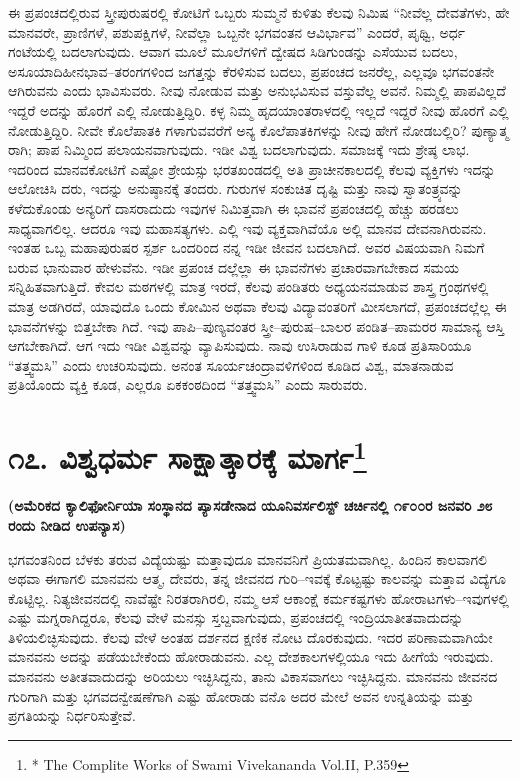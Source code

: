 ಈ ಪ್ರಪಂಚದಲ್ಲಿರುವ ಸ್ತ್ರೀಪುರುಷರಲ್ಲಿ ಕೋಟಿಗೆ ಒಬ್ಬರು ಸುಮ್ಮನೆ ಕುಳಿತು ಕೆಲವು ನಿಮಿಷ “ನೀವೆಲ್ಲ ದೇವತೆಗಳು, ಹೇ ಮಾನವರೇ, ಪ್ರಾಣಿಗಳೆ, ಪಶುಪಕ್ಷಿಗಳೆ, ನೀವೆಲ್ಲಾ ಒಬ್ಬನೇ ಭಗವಂತನ ಆವಿರ್ಭಾವ” ಎಂದರೆ, ಪೃಥ್ವಿ, ಅರ್ಧ ಗಂಟೆಯಲ್ಲಿ ಬದಲಾಗುವುದು. ಆವಾಗ ಮೂಲೆ ಮೂಲೆಗಳಿಗೆ ದ್ವೇಷದ ಸಿಡಿಗುಂಡನ್ನು ಎಸೆಯುವ ಬದಲು, ಅಸೂಯಾದಿಹೀನಭಾವ–ತರಂಗಗಳಿಂದ ಜಗತ್ತನ್ನು ಕೆರಳಿಸುವ ಬದಲು, ಪ್ರಪಂಚದ ಜನರೆಲ್ಲ, ಎಲ್ಲವೂ ಭಗವಂತನೇ ಆಗಿರುವನು ಎಂದು ಭಾವಿಸುವರು. ನೀವು ನೋಡುವ ಮತ್ತು ಅನುಭವಿಸುವ ವಸ್ತುವೆಲ್ಲ ಅವನೆ. ನಿಮ್ಮಲ್ಲಿ ಪಾಪವಿಲ್ಲದೆ ಇದ್ದರೆ ಅದನ್ನು ಹೊರಗೆ ಎಲ್ಲಿ ನೋಡುತ್ತಿದ್ದಿರಿ. ಕಳ್ಳ ನಿಮ್ಮ ಹೃದಯಾಂತರಾಳದಲ್ಲಿ ಇಲ್ಲದೆ ಇದ್ದರೆ ನೀವು ಹೊರಗೆ ಎಲ್ಲಿ ನೋಡುತ್ತಿದ್ದಿರಿ. ನೀವೇ ಕೊಲೆಪಾತಕಿ ಗಳಾಗುವವರೆಗೆ ಅನ್ಯ ಕೊಲೆಪಾತಕಿಗಳನ್ನು ನೀವು ಹೇಗೆ ನೋಡಬಲ್ಲಿರಿ? ಪುಣ್ಯಾತ್ಮ ರಾಗಿ; ಪಾಪ ನಿಮ್ಮಿಂದ ಪಲಾಯನವಾಗುವುದು. ಇಡೀ ವಿಶ್ವ ಬದಲಾಗುವುದು. ಸಮಾಜಕ್ಕೆ ಇದು ಶ್ರೇಷ್ಠ ಲಾಭ. ಇದರಿಂದ ಮಾನವಕೋಟಿಗೆ ಎಷ್ಟೋ ಶ್ರೇಯಸ್ಸು ಭರತಖಂಡದಲ್ಲಿ ಅತಿ ಪ್ರಾಚೀನಕಾಲದಲ್ಲಿ ಕೆಲವು ವ್ಯಕ್ತಿಗಳು ಇದನ್ನು ಆಲೋಚಿಸಿ ದರು, ಇದನ್ನು ಅನುಷ್ಠಾನಕ್ಕೆ ತಂದರು. ಗುರುಗಳ ಸಂಕುಚಿತ ದೃಷ್ಟಿ ಮತ್ತು ನಾವು ಸ್ವಾತಂತ್ರ್ಯವನ್ನು ಕಳೆದುಕೊಂಡು ಅನ್ಯರಿಗೆ ದಾಸರಾದುದು ಇವುಗಳ ನಿಮಿತ್ತವಾಗಿ ಈ ಭಾವನೆ ಪ್ರಪಂಚದಲ್ಲಿ ಹೆಚ್ಚು ಹರಡಲು ಸಾಧ್ಯವಾಗಲಿಲ್ಲ. ಆದರೂ ಇವು ಮಹಾಸತ್ಯಗಳು. ಎಲ್ಲಿ ಇವು ವ್ಯಕ್ತವಾಗಿವೆಯೊ ಅಲ್ಲಿ ಮಾನವ ದೇವನಾಗಿರುವನು. ಇಂತಹ ಒಬ್ಬ ಮಹಾಪುರುಷರ ಸ್ಪರ್ಶ ಒಂದರಿಂದ ನನ್ನ ಇಡೀ ಜೀವನ ಬದಲಾಗಿದೆ. ಅವರ ವಿಷಯವಾಗಿ ನಿಮಗೆ ಬರುವ ಭಾನುವಾರ ಹೇಳುವೆನು. ಇಡೀ ಪ್ರಪಂಚ ದಲ್ಲೆಲ್ಲಾ ಈ ಭಾವನೆಗಳು ಪ್ರಚಾರವಾಗಬೇಕಾದ ಸಮಯ ಸನ್ನಿಹಿತವಾಗುತ್ತಿದೆ. ಕೇವಲ ಮಠಗಳಲ್ಲಿ ಮಾತ್ರ ಇರದೆ, ಕೆಲವು ಪಂಡಿತರು ಅಧ್ಯಯನಮಾಡುವ ಶಾಸ್ತ್ರ ಗ್ರಂಥಗಳಲ್ಲಿ ಮಾತ್ರ ಅಡಗಿರದೆ, ಯಾವುದೊ ಒಂದು ಕೋಮಿನ ಅಥವಾ ಕೆಲವು ವಿದ್ಯಾವಂತರಿಗೆ ಮೀಸಲಾಗದೆ, ಪ್ರಪಂಚದಲ್ಲೆಲ್ಲ ಈ ಭಾವನೆಗಳನ್ನು ಬಿತ್ತಬೇಕಾ ಗಿದೆ. ಇವು ಪಾಪಿ–ಪುಣ್ಯವಂತರ ಸ್ತ್ರೀ–ಪುರುಷ–ಬಾಲರ ಪಂಡಿತ–ಪಾಮರರ ಸಾಮಾನ್ಯ ಆಸ್ತಿ ಆಗಬೇಕಾಗಿದೆ. ಆಗ ಇದು ಇಡೀ ವಿಶ್ವವನ್ನು ವ್ಯಾಪಿಸುವುದು. ನಾವು ಉಸಿರಾಡುವ ಗಾಳಿ ಕೂಡ ಪ್ರತಿಸಾರಿಯೂ “ತತ್ತ್ವಮಸಿ” ಎಂದು ಉಚರಿಸುವುದು. ಅನಂತ ಸೂರ್ಯಚಂದ್ರಾವಳಿಗಳಿಂದ ಕೂಡಿದ ವಿಶ್ವ, ಮಾತನಾಡುವ ಪ್ರತಿಯೊಂದು ವ್ಯಕ್ತಿ ಕೂಡ, ಎಲ್ಲರೂ ಏಕಕಂಠದಿಂದ “ತತ್ತ್ವಮಸಿ” ಎಂದು ಸಾರುವರು.

\chapter[ವಿಶ್ವಧರ್ಮ ಸಾಕ್ಷಾತ್ಕಾರಕ್ಕೆ ಮಾರ್ಗ]{\num{೧೭.} ವಿಶ್ವಧರ್ಮ ಸಾಕ್ಷಾತ್ಕಾರಕ್ಕೆ ಮಾರ್ಗ\protect\footnote{* The Complite Works of Swami Vivekananda Vol.II, P.359}}

\centerline{\textbf{(ಅಮೆರಿಕದ ಕ್ಯಾಲಿಫೋರ್ನಿಯಾ ಸಂಸ್ಥಾನದ ಪ್ಯಾಸಡೇನಾದ ಯೂನಿವರ್ಸಲಿಸ್ಟ್​ ಚರ್ಚಿನಲ್ಲಿ ೧೯೦೦ರ ಜನವರಿ ೨೮ ರಂದು ನೀಡಿದ ಉಪನ್ಯಾಸ)}}

ಭಗವಂತನಿಂದ ಬೆಳಕು ತರುವ ವಿದ್ಯೆಯಷ್ಟು ಮತ್ತಾವುದೂ ಮಾನವನಿಗೆ ಪ್ರಿಯತಮವಾಗಿಲ್ಲ. ಹಿಂದಿನ ಕಾಲವಾಗಲಿ ಅಥವಾ ಈಗಾಗಲಿ ಮಾನವನು ಆತ್ಮ, ದೇವರು, ತನ್ನ ಜೀವನದ ಗುರಿ–ಇವಕ್ಕೆ ಕೊಟ್ಟಷ್ಟು ಕಾಲವನ್ನು ಮತ್ತಾವ ವಿದ್ಯೆಗೂ ಕೊಟ್ಟಿಲ್ಲ. ನಿತ್ಯಜೀವನದಲ್ಲಿ ನಾವೆಷ್ಟೇ ನಿರತರಾಗಿರಲಿ, ನಮ್ಮ ಆಸೆ ಆಕಾಂಕ್ಷೆ ಕರ್ಮಕಷ್ಟಗಳು ಹೋರಾಟಗಳು–ಇವುಗಳಲ್ಲಿ ಎಷ್ಟು ಮಗ್ನರಾಗಿದ್ದರೂ, ಕೆಲವು ವೇಳೆ ಮನಸ್ಸು ಸ್ತಬ್ದವಾಗುವುದು, ಪ್ರಪಂಚದಲ್ಲಿ ಇಂದ್ರಿಯಾತೀತವಾದುದನ್ನು ತಿಳಿಯಲಿಚ್ಛಿಸುವುದು. ಕೆಲವು ವೇಳೆ ಅಂತಹ ದರ್ಶನದ ಕ್ಷಣಿಕ ನೋಟ ದೊರಕುವುದು. ಇದರ ಪರಿಣಾಮವಾಗಿಯೇ ಮಾನವನು ಅದನ್ನು ಪಡೆಯಬೇಕೆಂದು ಹೋರಾಡುವನು. ಎಲ್ಲ ದೇಶಕಾಲಗಳಲ್ಲಿಯೂ ಇದು ಹೀಗೆಯೆ ಇರುವುದು. ಮಾನವನು ಅತೀತವಾದುದನ್ನು ಅರಿಯಲು ಇಚ್ಛಿಸಿದ್ದನು, ತಾನು ವಿಕಾಸವಾಗಲು ಇಚ್ಛಿಸಿದ್ದನು. ಮಾನವನು ಜೀವನದ ಗುರಿಗಾಗಿ ಮತ್ತು ಭಗವದನ್ವೇಷಣೆಗಾಗಿ ಎಷ್ಟು ಹೋರಾಡು ವನೊ ಅದರ ಮೇಲೆ ಅವನ ಉನ್ನತಿಯನ್ನು ಮತ್ತು ಪ್ರಗತಿಯನ್ನು ನಿರ್ಧರಿಸುತ್ತೇವೆ.


